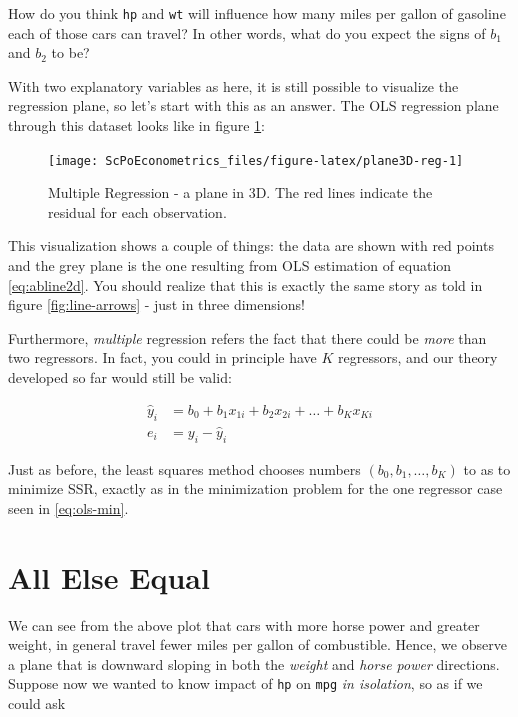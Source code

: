 \documentclass[]{book}
\begin{document}
How do you think \texttt{hp} and \texttt{wt} will influence how many miles per gallon of gasoline each of those cars can travel? In other words, what do you expect the signs of \(b_1\) and \(b_2\) to be?

With two explanatory variables as here, it is still possible to visualize the regression plane, so let's start with this as an answer. The OLS regression plane through this dataset looks like in figure \ref{fig:plane3D-reg}:

\begin{figure}

{\centering \texttt{[image: ScPoEconometrics\_files/figure-latex/plane3D-reg-1]} 

}

\caption{Multiple Regression - a plane in 3D. The red lines indicate the residual for each observation.}\label{fig:plane3D-reg}
\end{figure}

This visualization shows a couple of things: the data are shown with red points and the grey plane is the one resulting from OLS estimation of equation \eqref{eq:abline2d}. You should realize that this is exactly the same story as told in figure \ref{fig:line-arrows} - just in three dimensions!

Furthermore, \emph{multiple} regression refers the fact that there could be \emph{more} than two regressors. In fact, you could in principle have \(K\) regressors, and our theory developed so far would still be valid:

\begin{align}
\hat{y}_i &= b_0 + b_1 x_{1i} +   b_2 x_{2i} + \dots + b_K x_{Ki}\\
e_i &= y_i - \hat{y}_i \label{eq:multiple-reg}
\end{align}

Just as before, the least squares method chooses numbers \((b_0,b_1,\dots,b_K)\) to as to minimize SSR, exactly as in the minimization problem for the one regressor case seen in \eqref{eq:ols-min}.

\hypertarget{ceteris}{%
\section{All Else Equal}\label{ceteris}}

We can see from the above plot that cars with more horse power and greater weight, in general travel fewer miles per gallon of combustible. Hence, we observe a plane that is downward sloping in both the \emph{weight} and \emph{horse power} directions. Suppose now we wanted to know impact of \texttt{hp} on \texttt{mpg} \emph{in isolation}, so as if we could ask
\end{document}
